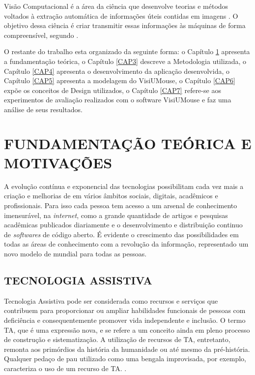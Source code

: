 Visão Computacional  é a área da ciência que desenvolve teorias e métodos voltados à extração automática de informações úteis contidas em imagens \cite{prince2012computer}. O objetivo dessa ciência é criar transmitir essas informações às máquinas de forma compreensível, segundo .


O restante do trabalho esta organizado da seguinte forma: o Capítulo \ref{CAP2} apresenta a fundamentação teórica, o Capítulo \ref{CAP3} descreve a Metodologia utilizada, o Capítulo \ref{CAP4} apresenta o desenvolvimento da aplicação desenvolvida, o Capítulo \ref{CAP5} apresenta a modelagem do VisiUMouse, o Capítulo \ref{CAP6} expõe os conceitos de Design utilizados, o Capítulo \ref{CAP7} refere-se aos experimentos de avaliação realizados com o software VisiUMouse e faz uma análise de seus resultados. 


\chapter{FUNDAMENTAÇÃO TEÓRICA E MOTIVAÇÕES}\label{CAP2}
A evolução contínua e exponencial das tecnologias possibilitam cada vez mais a criação e melhorias de em vários âmbitos sociais, digitais, acadêmicos e profissionais. 
Para isso cada pessoa tem acesso a um arsenal de conhecimento imensurável, na \textit{internet}, como a grande quantidade de artigos e pesquisas acadêmicas publicados diariamente e o desenvolvimento e distribuição continuo de \textit{softwares} de código aberto. É evidente o crescimento das possibilidades em todas as áreas de conhecimento com a revolução da informação, representado um novo modelo de mundial para todas as pessoas.


\section{TECNOLOGIA ASSISTIVA}\label{Sub:ta-brasil}
Tecnologia Assistiva pode ser considerada como recursos e serviços que contribuem para proporcionar ou ampliar habilidades funcionais de pessoas com deficiência e consequentemente promover vida independente e inclusão. O termo TA, que é uma expressão nova, e se refere a um conceito ainda em pleno processo de construção e sistematização. A utilização de recursos de TA, entretanto, remonta aos primórdios da história da humanidade ou até mesmo da pré-história. Qualquer pedaço de pau utilizado como uma bengala improvisada, por exemplo, caracteriza o uso de um recurso de TA. \cite{galvao2009tecnologia-UPPERCASE}.

